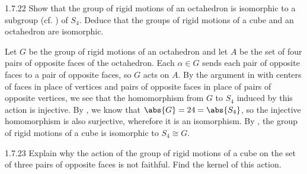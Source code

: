 \begin{exercise}{1.7.22}
    Show that the group of rigid motions of an octahedron is isomorphic to a subgroup (cf. ) of $S_4$. 
    Deduce that the groups of rigid motions of a cube and an octahedron are isomorphic.
\end{exercise}

\begin{sol}
    Let $G$ be the group of rigid motions of an octahedron and let $A$ be the set of four pairs of opposite faces of the octahedron.
	Each $\alpha \in G$ sends each pair of opposite faces to a pair of opposite faces, so $G$ acts on $A$.
    By the argument in  with centers of faces in place of vertices and pairs of opposite faces in place of pairs of opposite vertices, we see that the homomorphism from $G$ to $S_4$ induced by this action is injective.
    By , we know that $\abs{G} = 24 = \abs{S_4}$, so the injective homomorphism is also surjective, wherefore it is an isomorphism.
    By , the group of rigid motions of a cube is isomorphic to $S_4 \cong G$.
\end{sol}

\begin{exercise}{1.7.23}
    Explain why the action of the group of rigid motions of a cube on the set of three pairs of opposite faces is not faithful.
	Find the kernel of this action.
\end{exercise}

